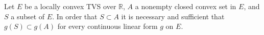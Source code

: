 Let $E$ be a locally convex TVS over $\mathbb{R}$, $A$ a nonempty closed convex set in $E$, and $S$ a subset of $E$. In order that $S \subset A$ it is necessary and sufficient that $g(S) \subset g(A)$ for every continuous linear form $g$ on $E$.